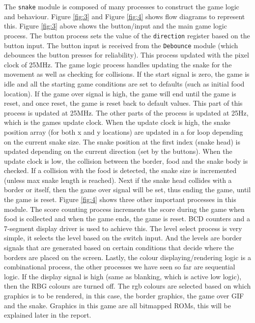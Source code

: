 \documentclass[aps, secnumarabic, balancelastpage, asmath, amssymb, nofootinbib, floatfix,]{revtex4-2}
\begin{document}
{The \verb|snake| module is composed of many processes to construct the game logic and behaviour. Figure \ref{fig:3} and Figure \ref{fig:4} shows flow diagrams to represent this. Figure \ref{fig:3} above shows the button/input and the main game logic process. The button process sets the value of the \verb|direction| register based on the button input. The button input is received from the \verb|Debounce| module (which debounces the button presses for reliability). This process updated with the pixel clock of 25MHz. The game logic process handles updating the snake for the movement as well as checking for collisions. If the start signal is zero, the game is idle and all the starting game conditions are set to defaults (such as initial food location). If the game over signal is high, the game will end until the game is reset, and once reset, the game is reset back to default values. This part of this process is updated at 25MHz. The other parts of the process is updated at 25Hz, which is the games update clock. When the update clock is high, the snake position array (for both x and y locations) are updated in a for loop depending on the current snake size. The snake position at the first index (snake head) is updated depending on the current direction (set by the buttons). When the update clock is low, the collision between the border, food and the snake body is checked. If a collision with the food is detected, the snake size is incremented (unless max snake length is reached). Next if the snake head collides with a border or itself, then the game over signal will be set, thus ending the game, until the game is reset.  Figure \ref{fig:4} shows three other important processes in this module. The score counting process increments the score during the game when food is collected and when the game ends, the game is reset. BCD counters and a 7-segment display driver is used to achieve this. The level select process is very simple, it selects the level based on the switch input. And the levels are border signals that are generated based on certain conditions that decide where the borders are placed on the screen. Lastly, the colour displaying/rendering logic is a combinational process, the other processes we have seen so far are sequential logic. If the display signal is high (same as blanking, which is active low logic), then the RBG colours are turned off. The rgb colours are selected based on which graphics is to be rendered, in this case, the border graphics, the game over GIF and the snake. Graphics in this game are all bitmapped ROMs, this will be explained later in the report. 

}
\end{document}
